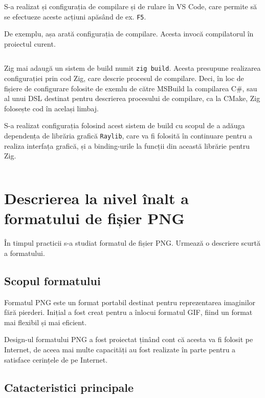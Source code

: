 \documentclass[a4paper,12pt]{report}
\begin{document}
S-a realizat și configurația de compilare și de rulare în VS Code,
care permite să se efectueze aceste acțiuni apăsând de ex. \texttt{F5}.

De exemplu, așa arată configurația de compilare.
Acesta invocă compilatorul în proiectul curent.

\inputminted{json}{../.vscode/tasks.json}

Zig mai adaugă un sistem de build numit \texttt{zig build}.
Acesta presupune realizarea configurației prin cod Zig, care descrie procesul de compilare.
Deci, în loc de fișiere de configurare folosite de exemlu de către MSBuild la compilarea C\#,
sau al unui \ac{DSL} destinat pentru descrierea procesului de compilare, ca la CMake,
Zig folosește cod în același limbaj.

S-a realizat configurația folosind acest sistem de build cu scopul de a adăuga dependența
de librăria grafică \texttt{Raylib}\cite{raylib}, care va fi folosită în continuare pentru a realiza
interfața grafică, și a binding-urile la funcții din această librărie pentru Zig.

\inputminted{zig}{../build.zig}


\section{Descrierea la nivel înalt a formatului de fișier \ac{PNG}}

În timpul practicii s-a studiat formatul de fișier \ac{PNG}\cite{png_spec}.
Urmează o descriere scurtă a formatului.

\subsection{Scopul formatului}

Formatul \ac{PNG} este un format portabil destinat pentru reprezentarea imaginilor fără pierderi.
Inițial a fost creat pentru a înlocui formatul \ac{GIF}, fiind un format mai flexibil și mai eficient.

Design-ul formatului \ac{PNG} a fost proiectat ținând cont că acesta va fi folosit pe Internet,
de aceea mai multe capacități au fost realizate în parte
pentru a satisface cerințele de pe Internet.

\subsection{Catacteristici principale}
\end{document}
